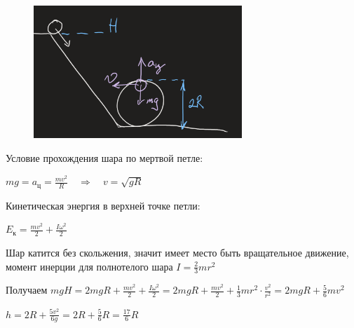 \documentclass[12pt]{article}
\begin{document}
    \begin{minipage}{\textwidth}
        \begin{figure}
            \includegraphics[height=5cm]{physics1/images/physics1_2024_10_21_1}
        \end{figure}
        
        Условие прохождения шара по мертвой петле: 
        
        $mg = a_{\text{ц}} = \frac{mv^2}{R} \quad \Longrightarrow \quad v = \sqrt{gR}$

        Кинетическая энергия в верхней точке петли: 
        
        $E_\text{к} = \frac{mv^2}{2} + \frac{I\omega^2}{2}$

        Шар катится без скольжения, значит имеет место быть вращательное движение, момент инерции для полнотелого шара $I = \frac{2}{3}mr^2$

        Получаем $mgH = 2mgR + \frac{mv^2}{2} + \frac{I\omega^2}{2} = 2mgR + \frac{mv^2}{2} + \frac{1}{3}mr^2 \cdot \frac{v^2}{r^2} = 
        2mgR + \frac{5}{6}mv^2$

        $h = 2R + \frac{5v^2}{6g} = 2R + \frac{5}{6}R = \frac{17}{6}R$
    \end{minipage}
\end{document}
